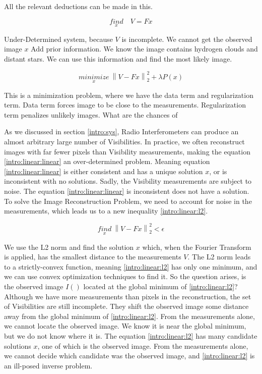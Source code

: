 All the relevant deductions can be made in this.

\begin{equation}\label{intro:linear:linear}
\underset{x}{find}\quad V = Fx
\end{equation}

Under-Determined system, because $V$ is incomplete. We cannot get the observed image $x$
Add prior information. We know the image contains hydrogen clouds and distant stars. We can use this information and find the most likely image.

\begin{equation}\label{intro:linear:compressed}
\underset{x}{minimize} \: \left \| V - Fx \right \|_2^2 + \lambda P(x)
\end{equation}

This is a minimization problem, where we have the data term and regularization term. Data term forces image to be close to the measurements. Regularization term penalizes unlikely images. What are the chances of




As we discussed in section \ref{intro:sys}, Radio Interferometers can produce an almost arbitrary large number of Visibilities. In practice, we often reconstruct images with far fewer pixels than Visibility measurements, making the equation \eqref{intro:linear:linear} an over-determined problem. Meaning equation \eqref{intro:linear:linear} is either consistent and has a unique solution $x$, or is inconsistent with no solutions. Sadly, the Visibility measurements are subject to noise. The equation \eqref{intro:linear:linear} is inconsistent does not have a solution. To solve the Image Reconstruction Problem, we need to account for noise in the measurements, which leads us to a new inequality \eqref{intro:linear:l2}.

\begin{equation}\label{intro:linear:l2}
\underset{x}{find} \: \left \| V - Fx \right \|_2^2 < \epsilon
\end{equation}

We use the L2 norm and find the solution $x$ which, when the Fourier Transform is applied, has the smallest distance to the measurements $V$. The L2 norm leads to a strictly-convex function, meaning \eqref{intro:linear:l2} has only one minimum, and we can use convex optimization techniques to find it. So the question arises, is the observed image $I()$ located at the global minimum of \eqref{intro:linear:l2}? Although we have more measurements than pixels in the reconstruction, the set of Visibilities are still incomplete. They shift the observed image some distance away from the global minimum of \eqref{intro:linear:l2}. From the measurements alone, we cannot locate the observed image. We know it is near the global minimum, but we do not know where it is. The equation \eqref{intro:linear:l2} has many candidate solutions $x$, one of which is the observed image.  From the measurements alone, we cannot decide which candidate was the observed image, and \eqref{intro:linear:l2} is an ill-posed inverse problem. 

